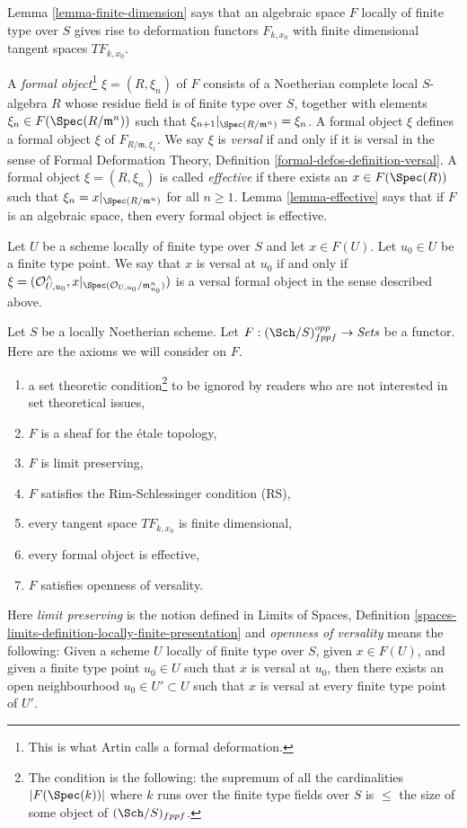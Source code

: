 \medskip\noindent
Lemma \ref{lemma-finite-dimension} says that an algebraic space $F$
locally of finite type over $S$ gives rise to deformation functors
$F_{k, x_0}$ with finite dimensional tangent spaces $TF_{k, x_0}$.

\medskip\noindent
A {\it formal object}\footnote{This is what Artin calls a formal deformation.}
$\xi = (R, \xi_n)$ of $F$ consists of a Noetherian
complete local $S$-algebra $R$ whose residue field is of finite type
over $S$, together with elements $\xi_n \in F(\Spec(R/\mathfrak m^n))$
such that $\xi_{n + 1}|_{\Spec(R/\mathfrak m^n)} = \xi_n$. A formal
object $\xi$ defines a formal object $\xi$ of $F_{R/\mathfrak m, \xi_1}$.
We say $\xi$ is {\it versal} if and only if it is versal in the sense of
Formal Deformation Theory, Definition \ref{formal-defos-definition-versal}.
A formal object $\xi = (R, \xi_n)$ is called {\it effective}
if there exists an $x \in F(\Spec(R))$ such that
$\xi_n = x|_{\Spec(R/\mathfrak m^n)}$ for all $n \geq 1$.
Lemma \ref{lemma-effective} says that if $F$ is an algebraic space,
then every formal object is effective.

\medskip\noindent
Let $U$ be a scheme locally of finite type over $S$ and let $x \in F(U)$.
Let $u_0 \in U$ be a finite type point. We say that $x$ is versal at $u_0$
if and only if
$\xi = (\mathcal{O}_{U, u_0}^\wedge,
x|_{\Spec(\mathcal{O}_{U, u_0}/\mathfrak m_{u_0}^n)})$
is a versal formal object in the sense described above.

\medskip\noindent
Let $S$ be a locally Noetherian scheme. Let
$F : (\Sch/S)_{fppf}^{opp} \to \textit{Sets}$ be a functor.
Here are the axioms we will consider on $F$.
\begin{enumerate}
\item[{[-1]}]  a set theoretic condition\footnote{The condition is the
following: the supremum of all the cardinalities
$|F(\Spec(k))|$ where $k$ runs over the finite
type fields over $S$ is $\leq$ the size of some
object of $(\Sch/S)_{fppf}$.} to be ignored by
readers who are not interested in set theoretical issues,
\item[{[0]}] $F$ is a sheaf for the \'etale topology,
\item[{[1]}] $F$ is limit preserving,
\item[{[2]}] $F$ satisfies the Rim-Schlessinger condition (RS),
\item[{[3]}] every tangent space $TF_{k, x_0}$ is finite dimensional,
\item[{[4]}] every formal object is effective,
\item[{[5]}] $F$ satisfies openness of versality.
\end{enumerate}
Here {\it limit preserving} is the notion defined in
Limits of Spaces, Definition
\ref{spaces-limits-definition-locally-finite-presentation} and
{\it openness of versality} means the following: Given a scheme $U$
locally of finite type over $S$, given $x \in F(U)$, and given
a finite type point $u_0 \in U$ such that $x$ is versal at $u_0$,
then there exists an open neighbourhood $u_0 \in U' \subset U$
such that $x$ is versal at every finite type point of $U'$.






